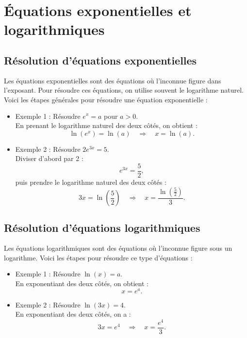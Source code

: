 \documentclass{article}
\begin{document}
	
	\section{Équations exponentielles et logarithmiques}
	
	\subsection{Résolution d'équations exponentielles}
	
	Les équations exponentielles sont des équations où l'inconnue figure dans l'exposant. Pour résoudre ces équations, on utilise souvent le logarithme naturel. Voici les étapes générales pour résoudre une équation exponentielle :
	
	\begin{itemize}
		\item Exemple 1 : Résoudre \( e^x = a \) pour \( a > 0 \).\\
		En prenant le logarithme naturel des deux côtés, on obtient :
		\[
		\ln(e^x) = \ln(a) \quad \Rightarrow \quad x = \ln(a).
		\]
		
		\item Exemple 2 : Résoudre \( 2e^{3x} = 5 \).\\
		Diviser d'abord par 2 :
		\[
		e^{3x} = \frac{5}{2},
		\]
		puis prendre le logarithme naturel des deux côtés :
		\[
		3x = \ln\left(\frac{5}{2}\right) \quad \Rightarrow \quad x = \frac{\ln\left(\frac{5}{2}\right)}{3}.
		\]
	\end{itemize}
	
	\subsection{Résolution d'équations logarithmiques}
	
	Les équations logarithmiques sont des équations où l'inconnue figure sous un logarithme. Voici les étapes pour résoudre ce type d'équations :
	
	\begin{itemize}
		\item Exemple 1 : Résoudre \( \ln(x) = a \).\\
		En exponentiant des deux côtés, on obtient :
		\[
		x = e^a.
		\]
		
		\item Exemple 2 : Résoudre \( \ln(3x) = 4 \).\\
		En exponentiant des deux côtés, on a :
		\[
		3x = e^4 \quad \Rightarrow \quad x = \frac{e^4}{3}.
		\]
	\end{itemize}
	
\end{document}
